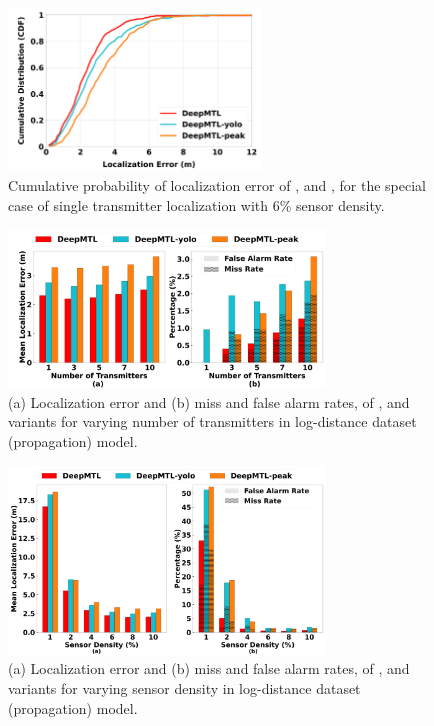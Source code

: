 \begin{figure}[ht]
	\centering
	\includegraphics[width=0.6\textwidth]{chapters/wowmom-pmc/figures/ours_cdf.png}
	\caption{Cumulative probability of localization error of \our, \ouryolo and \ourpeak, for the special case of single transmitter localization with 6\% sensor density.}
	\label{fig:ours_cdf}
\end{figure}

\begin{figure}[ht]
	\centering
	\includegraphics[width=0.75\textwidth]{chapters/wowmom-pmc/figures/ours_error_missfalse_vary_numintru.png}
	\caption{(a) Localization error and (b) miss and false alarm rates, of \our, \ouryolo and \ourpeak variants for varying number of transmitters in log-distance dataset (propagation) model.}
	\label{fig:ours_vary_numintru}
\end{figure}

\begin{figure}[ht]
	\centering
	\includegraphics[width=0.75\textwidth]{chapters/wowmom-pmc/figures/ours_error_missfalse_vary_sendensity.png}
	\caption{(a) Localization error and (b) miss and false alarm rates, of \our, \ouryolo and \ourpeak variants for varying sensor density in log-distance dataset (propagation) model.}
	\label{fig:ours_vary_sendensity}
\end{figure}



